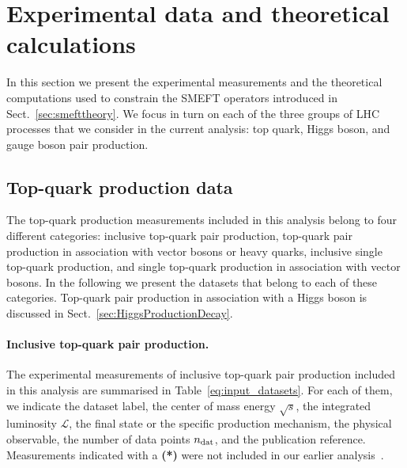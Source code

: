 \section{Experimental data and theoretical calculations}
\label{sec:settings_expdata}

In this section we present the experimental measurements and the theoretical
computations used to constrain the SMEFT operators
introduced in
Sect.~\ref{sec:smefttheory}.
%
We focus in turn on each of the three
groups of LHC processes that we consider in the current analysis:
top quark, Higgs boson,
and gauge boson pair production.

\subsection{Top-quark production data}
\label{sec:exptop}

The top-quark production measurements included in this analysis belong to four
different categories: inclusive top-quark pair production, top-quark pair
production in association with vector bosons or heavy quarks, inclusive single
top-quark production, and single top-quark production in association with
vector bosons.
%
In the following we present the datasets that belong to each of
these categories. Top-quark pair production in association
with a Higgs boson is discussed in Sect.~\ref{sec:HiggsProductionDecay}.

\paragraph{Inclusive top-quark pair production.}
%
The experimental measurements of inclusive top-quark pair production
included in this analysis are summarised in Table~\ref{eq:input_datasets}. 
For each of them, we indicate the dataset label, the center of mass energy
$\sqrt{s}$, the integrated luminosity $\mathcal{L}$, the final state or the
specific production mechanism, the physical observable, the number of data 
points $n_{\rm dat}$, and the publication reference. Measurements indicated with
a {\bf (*)} were not included in our earlier analysis~\cite{Hartland:2019bjb}.

